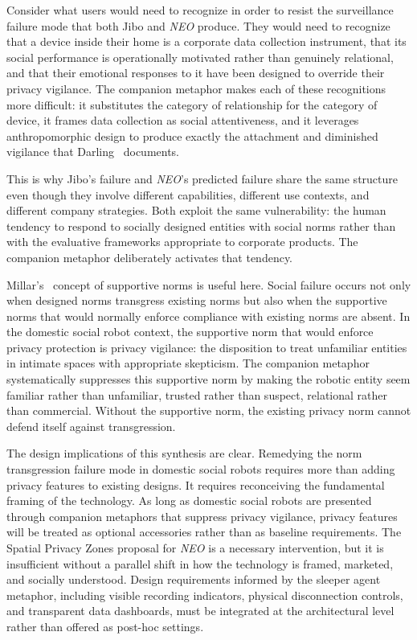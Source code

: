 \documentclass[11pt,showkeys]{../../shared/essay}
\newcommand{\neo}{\textit{NEO}}
\begin{document}
Consider what users would need to recognize in order to resist the surveillance failure mode that both Jibo and \neo{} produce. They would need to recognize that a device inside their home is a corporate data collection instrument, that its social performance is operationally motivated rather than genuinely relational, and that their emotional responses to it have been designed to override their privacy vigilance. The companion metaphor makes each of these recognitions more difficult: it substitutes the category of relationship for the category of device, it frames data collection as social attentiveness, and it leverages anthropomorphic design to produce exactly the attachment and diminished vigilance that Darling~\cite{darling_whos_2015} documents.

This is why Jibo's failure and \neo{}'s predicted failure share the same structure even though they involve different capabilities, different use contexts, and different company strategies. Both exploit the same vulnerability: the human tendency to respond to socially designed entities with social norms rather than with the evaluative frameworks appropriate to corporate products. The companion metaphor deliberately activates that tendency.

Millar's~\cite{millar_social_2020} concept of supportive norms is useful here. Social failure occurs not only when designed norms transgress existing norms but also when the supportive norms that would normally enforce compliance with existing norms are absent. In the domestic social robot context, the supportive norm that would enforce privacy protection is privacy vigilance: the disposition to treat unfamiliar entities in intimate spaces with appropriate skepticism. The companion metaphor systematically suppresses this supportive norm by making the robotic entity seem familiar rather than unfamiliar, trusted rather than suspect, relational rather than commercial. Without the supportive norm, the existing privacy norm cannot defend itself against transgression.

The design implications of this synthesis are clear. Remedying the norm transgression failure mode in domestic social robots requires more than adding privacy features to existing designs. It requires reconceiving the fundamental framing of the technology. As long as domestic social robots are presented through companion metaphors that suppress privacy vigilance, privacy features will be treated as optional accessories rather than as baseline requirements. The Spatial Privacy Zones proposal for \neo{} is a necessary intervention, but it is insufficient without a parallel shift in how the technology is framed, marketed, and socially understood. Design requirements informed by the sleeper agent metaphor, including visible recording indicators, physical disconnection controls, and transparent data dashboards, must be integrated at the architectural level rather than offered as post-hoc settings.
\end{document}
